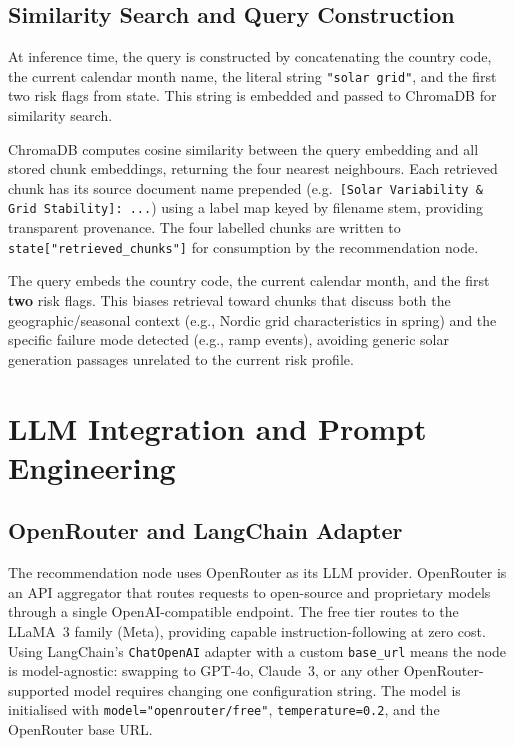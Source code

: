 \documentclass[12pt, a4paper]{article}
\begin{document}
\subsection{Similarity Search and Query Construction}

At inference time, the query is constructed by concatenating the country code, the current calendar month name, the literal string \texttt{"solar grid"}, and the first two risk flags from state. This string is embedded and passed to ChromaDB for similarity search.

ChromaDB computes cosine similarity between the query embedding and all stored chunk embeddings, returning the four nearest neighbours. Each retrieved chunk has its source document name prepended (e.g.\ \texttt{[Solar Variability \& Grid Stability]: ...}) using a label map keyed by filename stem, providing transparent provenance. The four labelled chunks are written to \texttt{state["retrieved\_chunks"]} for consumption by the recommendation node.

The query embeds the country code, the current calendar month, and the first \textbf{two} risk flags. This biases retrieval toward chunks that discuss both the geographic/seasonal context (e.g., Nordic grid characteristics in spring) and the specific failure mode detected (e.g., ramp events), avoiding generic solar generation passages unrelated to the current risk profile.

\newpage
\section{LLM Integration and Prompt Engineering}
\label{sec:llm}

\subsection{OpenRouter and LangChain Adapter}

The recommendation node uses OpenRouter as its LLM provider. OpenRouter is an API aggregator that routes requests to open-source and proprietary models through a single OpenAI-compatible endpoint. The free tier routes to the LLaMA~3 family (Meta), providing capable instruction-following at zero cost. Using LangChain's \texttt{ChatOpenAI} adapter with a custom \texttt{base\_url} means the node is model-agnostic: swapping to GPT-4o, Claude~3, or any other OpenRouter-supported model requires changing one configuration string. The model is initialised with \texttt{model="openrouter/free"}, \texttt{temperature=0.2}, and the OpenRouter base URL.
\end{document}
